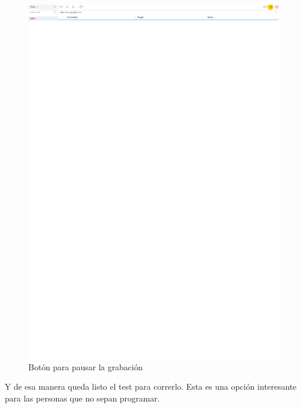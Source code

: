 \documentclass[conference]{IEEEtran}
\begin{document}
\begin{figure}[H]
\centering
\includegraphics[scale=0.47]{imagenes/19pausargrabacion.pdf}
\caption{Botón para pausar la grabación}
\end{figure}



Y de esa manera queda listo el test para correrlo. Esta es una opción interesante para las personas que no sepan programar.




\normalsize
\end{document}
